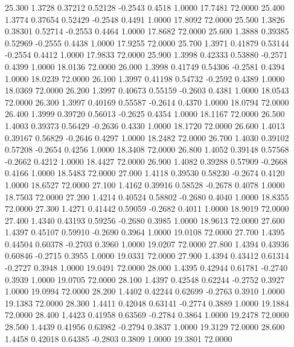   25.300   1.3728   0.37212   0.52128  -0.2543   0.4518   1.0000  17.7481  72.0000
  25.400   1.3774   0.37654   0.52429  -0.2548   0.4491   1.0000  17.8092  72.0000
  25.500   1.3826   0.38301   0.52714  -0.2553   0.4464   1.0000  17.8682  72.0000
  25.600   1.3888   0.39385   0.52969  -0.2555   0.4438   1.0000  17.9255  72.0000
  25.700   1.3971   0.41879   0.53144  -0.2554   0.4412   1.0000  17.9833  72.0000
  25.900   1.3998   0.42333   0.53880  -0.2571   0.4399   1.0000  18.0136  72.0000
  26.000   1.3998   0.41749   0.54306  -0.2581   0.4394   1.0000  18.0239  72.0000
  26.100   1.3997   0.41198   0.54732  -0.2592   0.4389   1.0000  18.0369  72.0000
  26.200   1.3997   0.40673   0.55159  -0.2603   0.4381   1.0000  18.0543  72.0000
  26.300   1.3997   0.40169   0.55587  -0.2614   0.4370   1.0000  18.0794  72.0000
  26.400   1.3999   0.39720   0.56013  -0.2625   0.4354   1.0000  18.1167  72.0000
  26.500   1.4003   0.39373   0.56429  -0.2636   0.4330   1.0000  18.1720  72.0000
  26.600   1.4013   0.39167   0.56829  -0.2646   0.4297   1.0000  18.2482  72.0000
  26.700   1.4030   0.39102   0.57208  -0.2654   0.4256   1.0000  18.3408  72.0000
  26.800   1.4052   0.39148   0.57568  -0.2662   0.4212   1.0000  18.4427  72.0000
  26.900   1.4082   0.39288   0.57909  -0.2668   0.4166   1.0000  18.5483  72.0000
  27.000   1.4118   0.39530   0.58230  -0.2674   0.4120   1.0000  18.6527  72.0000
  27.100   1.4162   0.39916   0.58528  -0.2678   0.4078   1.0000  18.7503  72.0000
  27.200   1.4214   0.40524   0.58802  -0.2680   0.4040   1.0000  18.8355  72.0000
  27.300   1.4271   0.41442   0.59059  -0.2682   0.4011   1.0000  18.9019  72.0000
  27.400   1.4340   0.43193   0.59256  -0.2680   0.3985   1.0000  18.9613  72.0000
  27.600   1.4397   0.45107   0.59910  -0.2690   0.3964   1.0000  19.0108  72.0000
  27.700   1.4395   0.44504   0.60378  -0.2703   0.3960   1.0000  19.0207  72.0000
  27.800   1.4394   0.43936   0.60846  -0.2715   0.3955   1.0000  19.0331  72.0000
  27.900   1.4394   0.43412   0.61314  -0.2727   0.3948   1.0000  19.0491  72.0000
  28.000   1.4395   0.42944   0.61781  -0.2740   0.3939   1.0000  19.0705  72.0000
  28.100   1.4397   0.42548   0.62244  -0.2752   0.3927   1.0000  19.0994  72.0000
  28.200   1.4402   0.42244   0.62699  -0.2763   0.3910   1.0000  19.1383  72.0000
  28.300   1.4411   0.42048   0.63141  -0.2774   0.3889   1.0000  19.1884  72.0000
  28.400   1.4423   0.41958   0.63569  -0.2784   0.3864   1.0000  19.2478  72.0000
  28.500   1.4439   0.41956   0.63982  -0.2794   0.3837   1.0000  19.3129  72.0000
  28.600   1.4458   0.42018   0.64385  -0.2803   0.3809   1.0000  19.3801  72.0000
